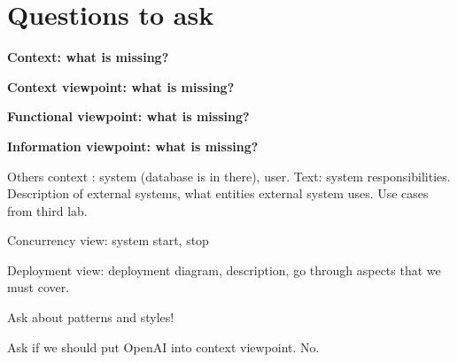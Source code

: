 \documentclass[a4paper,12pt]{article}
\begin{document}
\tableofcontents
\newpage

\section{Questions to ask}

\textbf{Context: what is missing?}

\textbf{Context viewpoint: what is missing?}

\textbf{Functional viewpoint: what is missing?}

\textbf{Information viewpoint: what is missing?}

Others context : system (database is in there), user. Text: system responsibilities. Description of external systems, what entities external system uses. Use cases from third lab.

Concurrency view: system start, stop

Deployment view: deployment diagram, description, go through aspects that we must cover.

Ask about patterns and styles!

Ask if we should put OpenAI into context viewpoint. No.












\listoffigures
\end{document}
